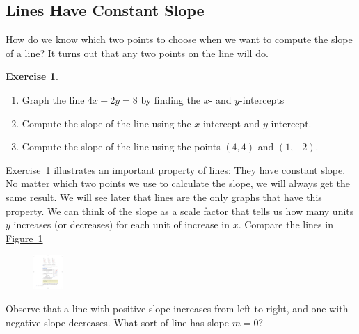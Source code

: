 \documentclass[10pt,]{book}
\theoremstyle{plain}
\theoremstyle{definition}
\theoremstyle{definition}
\theoremstyle{definition}
\theoremstyle{definition}
\theoremstyle{definition}
\newtheorem{exercise}[theorem]{Exercise}
\numberwithin{equation}{section}
\begin{document}
\subsection[Lines Have Constant Slope]{Lines Have Constant Slope}\label{subsection-21}

    How do we know which two points to choose when we want to compute the slope of a line? It turns out that any two points on the line will do.
%
\begin{exercise}\label{exercise-slope-any-points}
\leavevmode%
\begin{enumerate}[label=*\alph**]
\item\hypertarget{li-142}{}Graph the line \(4x − 2y = 8\) by finding the \(x\)- and \(y\)-intercepts\item\hypertarget{li-143}{}Compute the slope of the line using the \(x\)-intercept and \(y\)-intercept.\item\hypertarget{li-144}{}Compute the slope of the line using the points \((4, 4)\) and \((1, −2)\).\end{enumerate}
\end{exercise}
\par

    \hyperref[exercise-slope-any-points]{Exercise~\ref{exercise-slope-any-points}} illustrates an important property of lines: They have constant slope. No matter which two points we use to calculate the slope, we will always get the same result. We will see later that lines are the only graphs that have this property. We can think of the slope as a scale factor that tells us how many units \(y\) increases (or decreases) for each unit of increase in \(x\). Compare the lines in \hyperref[fig-slope-scale-factor]{Figure~\ref{fig-slope-scale-factor}}
    \leavevmode%
\begin{figure}
\centering
\includegraphics[width=0.100\textwidth,]{images/fig-slope-scale-factor.pdf}\caption{\label{fig-slope-scale-factor}}
\end{figure}

    Observe that a line with positive slope increases from left to right, and one with negative slope decreases. What sort of line has slope \(m = 0\)?
%
\typeout{************************************************}
\typeout{************************************************}
\end{document}
